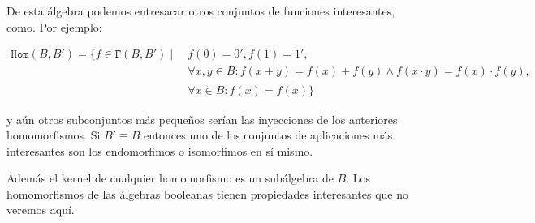   De esta álgebra podemos entresacar otros conjuntos de funciones
  interesantes, como. Por ejemplo:

  \begin{align*}
  \mathtt{Hom}(B,B') = \{ f \in \mathtt{F}(B,B') \mid \ &f(0) = 0', f(1) = 1', \\
  &\forall x,y \in B : f(x + y) = f(x) + f(y) \land f(x \cdot y) = f(x) \cdot f(y), \\
  &\forall x \in B : f(\overline{x}) = \overline{f(x)} \}
  \end{align*}

  y aún otros subconjuntos más pequeños serían las inyecciones de los
  anteriores homomorfismos. Si $B' \equiv B$ entonces uno de los
  conjuntos de aplicaciones más interesantes son los endomorfimos o
  isomorfimos en sí mismo.

  Además el kernel de cualquier homomorfismo es un subálgebra de $B.$
  Los homomorfismos de las álgebras booleanas tienen propiedades
  interesantes que no veremos aquí.
